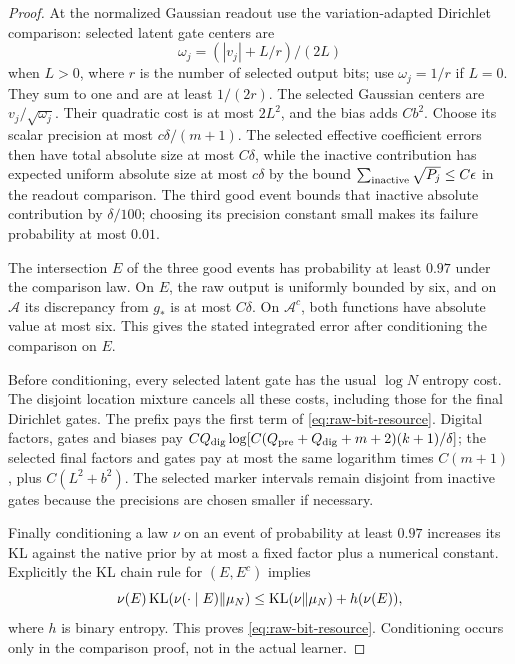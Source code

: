 \begin{proof}
At the normalized Gaussian readout use the variation-adapted
Dirichlet comparison: selected latent gate centers are
\[
 \omega_j=(|v_j|+L/r)/(2L)
\]
when $L>0$, where $r$ is the number of selected output bits; use
$\omega_j=1/r$ if $L=0$. They sum to one and are at least $1/(2r)$.
The selected Gaussian centers are $v_j/\sqrt{\omega_j}$.
Their quadratic cost is at most $2L^2$, and the bias adds $Cb^2$.
Choose its scalar precision at most $c\delta/(m+1)$.
The selected effective coefficient errors then have total absolute
size at most $C\delta$, while the inactive contribution has expected
uniform absolute size at most $c\delta$ by the bound
$\sum_{\rm inactive}\sqrt{P_j}\le C\epsilon$ in the readout comparison.
The third good event bounds that inactive absolute contribution by
$\delta/100$; choosing its precision constant small makes its
failure probability at most $0.01$.

The intersection $E$ of the three good events has probability at
least $0.97$ under the comparison law. On $E$, the raw output is
uniformly bounded by six, and on $\mathcal A$ its discrepancy from
$g_*$ is at most $C\delta$. On $\mathcal A^c$, both functions have
absolute value at most six. This gives the stated integrated error
after conditioning the comparison on $E$.

Before conditioning, every selected latent gate has the usual
$\log N$ entropy cost. The disjoint location mixture cancels all
these costs, including those for the final Dirichlet gates.
The prefix pays the first term of
\eqref{eq:raw-bit-resource}. Digital factors, gates and biases pay
$C Q_{\rm dig}\log[C(Q_{\rm pre}+Q_{\rm dig}+m+2)(k+1)/\delta]$;
the selected final factors and gates pay at most the same logarithm
times $C(m+1)$, plus $C(L^2+b^2)$.
The selected marker intervals remain disjoint from inactive gates
because the precisions are chosen smaller if necessary.

Finally conditioning a law $\nu$ on an event of probability at
least $0.97$ increases its KL against the native prior by at most
a fixed factor plus a numerical constant. Explicitly the KL chain
rule for $(E,E^c)$ implies
\[
 \nu(E)\operatorname{KL}(\nu(\cdot\mid E)\Vert\mu_N)
 \le\operatorname{KL}(\nu\Vert\mu_N)+h(\nu(E)),
\]
where $h$ is binary entropy. This proves
\eqref{eq:raw-bit-resource}. Conditioning occurs only in the
comparison proof, not in the actual learner.
\end{proof}

